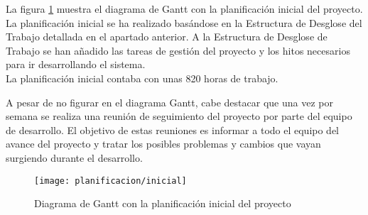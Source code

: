 La figura \ref{fig:gantt_inicial} muestra el diagrama de Gantt con la planificación inicial del proyecto.  La planificación inicial se ha realizado basándose en la Estructura de Desglose del Trabajo detallada en el apartado anterior.  A la Estructura de Desglose de Trabajo se han añadido las tareas de gestión del proyecto y los hitos necesarios para ir desarrollando el sistema.\\
La planificación inicial contaba con unas 820 horas de trabajo.

A pesar de no figurar en el diagrama Gantt, cabe destacar que una vez por semana se realiza una reunión de seguimiento del proyecto por parte del equipo de desarrollo.  El objetivo de estas reuniones es informar a todo el equipo del avance del proyecto y tratar los posibles problemas y cambios que vayan surgiendo durante el desarrollo.

\begin{figure}[h]
	\centering
	\texttt{[image: planificacion/inicial]}
	\caption{Diagrama de Gantt con la planificación inicial del proyecto}
	\label{fig:gantt_inicial}
\end{figure}